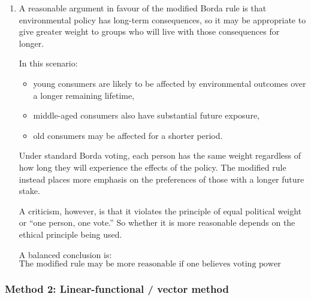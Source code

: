 \documentclass[12pt]{article}
\begin{document}
\begin{enumerate}[label=(\alph*)]
    \item
    A reasonable argument in favour of the modified Borda rule is that environmental policy has long-term consequences, so it may be appropriate to give greater weight to groups who will live with those consequences for longer.

    In this scenario:
    \begin{itemize}[leftmargin=*]
        \item young consumers are likely to be affected by environmental outcomes over a longer remaining lifetime,
        \item middle-aged consumers also have substantial future exposure,
        \item old consumers may be affected for a shorter period.
    \end{itemize}

    Under standard Borda voting, each person has the same weight regardless of how long they will experience the effects of the policy. The modified rule instead places more emphasis on the preferences of those with a longer future stake.

    A criticism, however, is that it violates the principle of equal political weight or ``one person, one vote.'' So whether it is more reasonable depends on the ethical principle being used.

    A balanced conclusion is:
    \[
    \boxed{\text{The modified rule may be more reasonable if one believes voting power should reflect long-run stake in environmental outcomes, but less reasonable if one insists on equal weight for every voter.}}
    \]
\end{enumerate}

\subsubsection{Method 2: Linear-functional / vector method}
\end{document}
